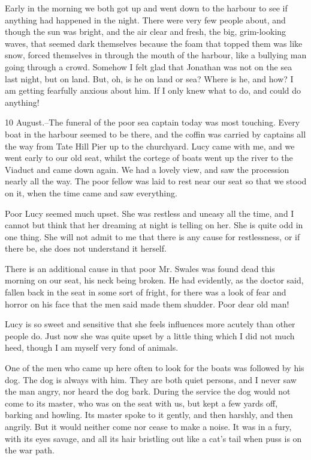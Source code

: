 Early in the morning we both got up and went down to the harbour to see if anything had happened in the night. There were very few people about, and though the sun was bright, and the air clear and fresh, the big, grim-looking waves, that seemed dark themselves because the foam that topped them was like snow, forced themselves in through the mouth of the harbour, like a bullying man going through a crowd. Somehow I felt glad that Jonathan was not on the sea last night, but on land. But, oh, is he on land or sea? Where is he, and how? I am getting fearfully anxious about him. If I only knew what to do, and could do anything! 

10 August.--The funeral of the poor sea captain today was most touching. Every boat in the harbour seemed to be there, and the coffin was carried by captains all the way from Tate Hill Pier up to the churchyard. Lucy came with me, and we went early to our old seat, whilst the cortege of boats went up the river to the Viaduct and came down again. We had a lovely view, and saw the procession nearly all the way. The poor fellow was laid to rest near our seat so that we stood on it, when the time came and saw everything. 

Poor Lucy seemed much upset. She was restless and uneasy all the time, and I cannot but think that her dreaming at night is telling on her. She is quite odd in one thing. She will not admit to me that there is any cause for restlessness, or if there be, she does not understand it herself. 

There is an additional cause in that poor Mr. Swales was found dead this morning on our seat, his neck being broken. He had evidently, as the doctor said, fallen back in the seat in some sort of fright, for there was a look of fear and horror on his face that the men said made them shudder. Poor dear old man! 

Lucy is so sweet and sensitive that she feels influences more acutely than other people do. Just now she was quite upset by a little thing which I did not much heed, though I am myself very fond of animals. 

One of the men who came up here often to look for the boats was followed by his dog. The dog is always with him. They are both quiet persons, and I never saw the man angry, nor heard the dog bark. During the service the dog would not come to its master, who was on the seat with us, but kept a few yards off, barking and howling. Its master spoke to it gently, and then harshly, and then angrily. But it would neither come nor cease to make a noise. It was in a fury, with its eyes savage, and all its hair bristling out like a cat's tail when puss is on the war path. 

